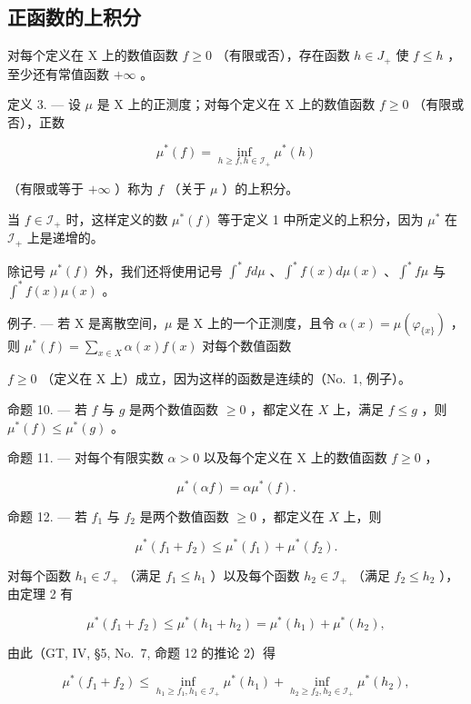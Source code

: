 \subsection{正函数的上积分}

对每个定义在 X 上的数值函数 \(f \geqslant 0\) （有限或否），存在函数 \(h \in J_{+}\) 使 \(f \leqslant h\) ，至少还有常值函数 \(+\infty\) 。

定义 3. --- 设 \(\mu\) 是 X 上的正测度；对每个定义在 X 上的数值函数 \(f \geqslant 0\) （有限或否），正数

\[
\mu^ {*} (f) = \inf _ {h \geqslant f, h \in \mathscr {I} _ {+}} \mu^ {*} (h)
\]

（有限或等于 \(+\infty\) ）称为 \(f\) （关于 \(\mu\) ）的上积分。

当 \(f \in \mathcal{I}_+\) 时，这样定义的数 \(\mu^*(f)\) 等于定义 1 中所定义的上积分，因为 \(\mu^*\) 在 \(\mathcal{I}_+\) 上是递增的。

除记号 \(\mu^{*}(f)\) 外，我们还将使用记号 \(\int^{*} f d\mu\) 、\(\int^{*} f(x) d\mu(x)\) 、\(\int^{*} f\mu\) 与 \(\int^{*} f(x)\mu(x)\) 。

例子. --- 若 X 是离散空间，\(\mu\) 是 X 上的一个正测度，且令 \(\alpha(x) = \mu(\varphi_{\{x\}})\) ，则 \(\mu^{*}(f) = \sum_{x \in X} \alpha(x)f(x)\) 对每个数值函数

\(f \geqslant 0\) （定义在 X 上）成立，因为这样的函数是连续的（No.~1, 例子）。

命题 10. --- 若 \(f\) 与 \(g\) 是两个数值函数 \(\geqslant 0\) ，都定义在 \(X\) 上，满足 \(f \leqslant g\) ，则 \(\mu^{*}(f) \leqslant \mu^{*}(g)\) 。

命题 11. --- 对每个有限实数 \(\alpha > 0\) 以及每个定义在 X 上的数值函数 \(f \geqslant 0\) ，

\[
\mu^ {*} (\alpha f) = \alpha \mu^ {*} (f).\tag{8}
\]

命题 12. --- 若 \(f_1\) 与 \(f_2\) 是两个数值函数 \(\geqslant 0\) ，都定义在 \(X\) 上，则

\[
\mu^ {*} (f _ {1} + f _ {2}) \leqslant \mu^ {*} (f _ {1}) + \mu^ {*} (f _ {2}).\tag{9}
\]

对每个函数 \(h_1 \in \mathcal{I}_+\) （满足 \(f_1 \leqslant h_1\) ）以及每个函数 \(h_2 \in \mathcal{I}_+\) （满足 \(f_2 \leqslant h_2\) ），由定理 2 有

\[
\mu^ {*} (f _ {1} + f _ {2}) \leqslant \mu^ {*} (h _ {1} + h _ {2}) = \mu^ {*} (h _ {1}) + \mu^ {*} (h _ {2}),
\]

由此（GT, IV, §5, No.~7, 命题 12 的推论 2）得

\[
\mu^ {*} (f _ {1} + f _ {2}) \leqslant \inf _ {h _ {1} \geqslant f _ {1}, h _ {1} \in \mathcal {I} _ {+}} \mu^ {*} (h _ {1}) + \inf _ {h _ {2} \geqslant f _ {2}, h _ {2} \in \mathcal {I} _ {+}} \mu^ {*} (h _ {2}),
\]

